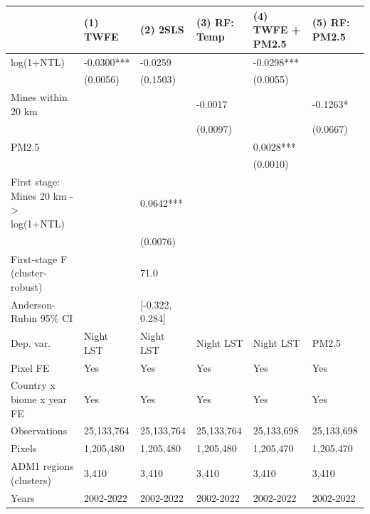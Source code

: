 \begin{tabular}{llllll}
\toprule
 & (1) TWFE & (2) 2SLS & (3) RF: Temp & (4) TWFE + PM2.5 & (5) RF: PM2.5 \\
\midrule
log(1+NTL) & -0.0300*** & -0.0259 &  & -0.0298*** &  \\
 & (0.0056) & (0.1503) &  & (0.0055) &  \\
Mines within 20 km &  &  & -0.0017 &  & -0.1263* \\
 &  &  & (0.0097) &  & (0.0667) \\
PM2.5 &  &  &  & 0.0028*** &  \\
 &  &  &  & (0.0010) &  \\
First stage: Mines 20 km -> log(1+NTL) &  & 0.0642*** &  &  &  \\
 &  & (0.0076) &  &  &  \\
First-stage F (cluster-robust) &  & 71.0 &  &  &  \\
Anderson-Rubin 95\% CI &  & [-0.322, 0.284] &  &  &  \\
Dep. var. & Night LST & Night LST & Night LST & Night LST & PM2.5 \\
Pixel FE & Yes & Yes & Yes & Yes & Yes \\
Country x biome x year FE & Yes & Yes & Yes & Yes & Yes \\
Observations & 25,133,764 & 25,133,764 & 25,133,764 & 25,133,698 & 25,133,698 \\
Pixels & 1,205,480 & 1,205,480 & 1,205,480 & 1,205,470 & 1,205,470 \\
ADM1 regions (clusters) & 3,410 & 3,410 & 3,410 & 3,410 & 3,410 \\
Years & 2002-2022 & 2002-2022 & 2002-2022 & 2002-2022 & 2002-2022 \\
\bottomrule
\end{tabular}
